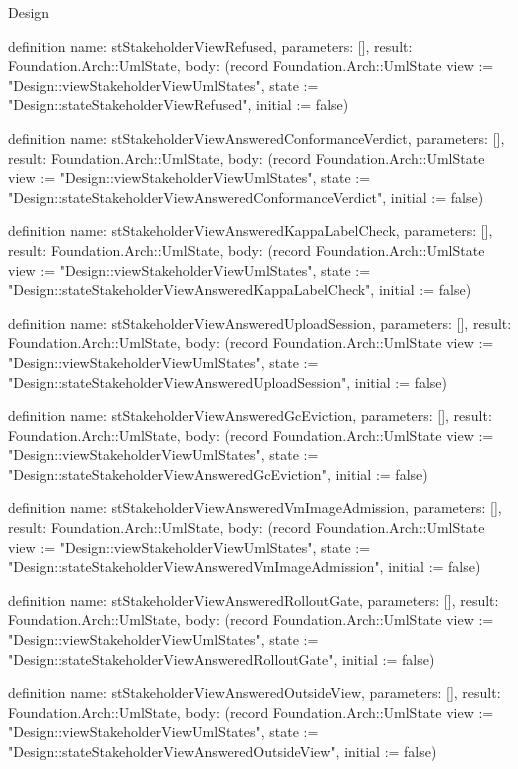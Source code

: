 \begin{lexlean}{Design}
\begin{semanticmodule}
definition{
  name: stStakeholderViewRefused,
  parameters: [],
  result: Foundation.Arch::UmlState,
  body: (record Foundation.Arch::UmlState {view := "Design::viewStakeholderViewUmlStates", state := "Design::stateStakeholderViewRefused", initial := false})
}

definition{
  name: stStakeholderViewAnsweredConformanceVerdict,
  parameters: [],
  result: Foundation.Arch::UmlState,
  body: (record Foundation.Arch::UmlState {view := "Design::viewStakeholderViewUmlStates", state := "Design::stateStakeholderViewAnsweredConformanceVerdict", initial := false})
}

definition{
  name: stStakeholderViewAnsweredKappaLabelCheck,
  parameters: [],
  result: Foundation.Arch::UmlState,
  body: (record Foundation.Arch::UmlState {view := "Design::viewStakeholderViewUmlStates", state := "Design::stateStakeholderViewAnsweredKappaLabelCheck", initial := false})
}

definition{
  name: stStakeholderViewAnsweredUploadSession,
  parameters: [],
  result: Foundation.Arch::UmlState,
  body: (record Foundation.Arch::UmlState {view := "Design::viewStakeholderViewUmlStates", state := "Design::stateStakeholderViewAnsweredUploadSession", initial := false})
}

definition{
  name: stStakeholderViewAnsweredGcEviction,
  parameters: [],
  result: Foundation.Arch::UmlState,
  body: (record Foundation.Arch::UmlState {view := "Design::viewStakeholderViewUmlStates", state := "Design::stateStakeholderViewAnsweredGcEviction", initial := false})
}

definition{
  name: stStakeholderViewAnsweredVmImageAdmission,
  parameters: [],
  result: Foundation.Arch::UmlState,
  body: (record Foundation.Arch::UmlState {view := "Design::viewStakeholderViewUmlStates", state := "Design::stateStakeholderViewAnsweredVmImageAdmission", initial := false})
}

definition{
  name: stStakeholderViewAnsweredRolloutGate,
  parameters: [],
  result: Foundation.Arch::UmlState,
  body: (record Foundation.Arch::UmlState {view := "Design::viewStakeholderViewUmlStates", state := "Design::stateStakeholderViewAnsweredRolloutGate", initial := false})
}

definition{
  name: stStakeholderViewAnsweredOutsideView,
  parameters: [],
  result: Foundation.Arch::UmlState,
  body: (record Foundation.Arch::UmlState {view := "Design::viewStakeholderViewUmlStates", state := "Design::stateStakeholderViewAnsweredOutsideView", initial := false})
}


\end{semanticmodule}
\end{lexlean}
